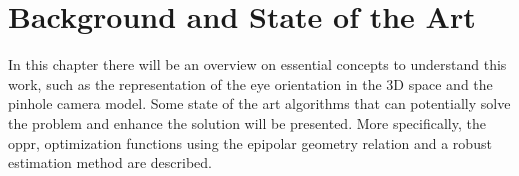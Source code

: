 
\chapter{Background and State of the Art}
\label{backgroundandsota}

In this chapter there will be an overview on essential concepts to understand this work, such as the representation of the eye orientation in the 3D space and the pinhole camera model. Some state of the art algorithms that can potentially solve the problem and enhance the solution will be presented. More specifically, the \acrlong{oppr}, optimization functions using the epipolar geometry relation and a robust estimation method are described.



%



